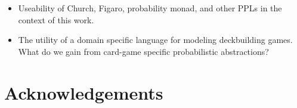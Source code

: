 \begin{itemize}
\item Useability of Church, Figaro, probability monad, and other
      PPLs in the context of this work.
\item The utility of a domain specific language for modeling deckbuilding
      games. What do we gain from card-game specific probabilistic
      abstractions?
\end{itemize}


\section{Acknowledgements} \label{sec:ack}

